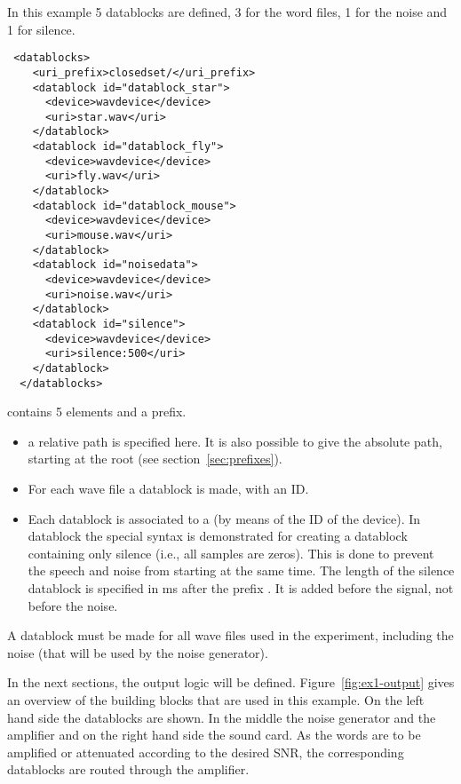 In this example 5 datablocks are defined, 3 for the word files, 1
for the noise and 1 for silence.

\begin{lstlisting}
 <datablocks>
    <uri_prefix>closedset/</uri_prefix>
    <datablock id="datablock_star">
      <device>wavdevice</device>
      <uri>star.wav</uri>
    </datablock>
    <datablock id="datablock_fly">
      <device>wavdevice</device>
      <uri>fly.wav</uri>
    </datablock>
    <datablock id="datablock_mouse">
      <device>wavdevice</device>
      <uri>mouse.wav</uri>
    </datablock>
    <datablock id="noisedata">
      <device>wavdevice</device>
      <uri>noise.wav</uri>
    </datablock>
    <datablock id="silence">
      <device>wavdevice</device>
      <uri>silence:500</uri>
    </datablock>
  </datablocks>
\end{lstlisting}

 contains 5  elements and a
prefix.
\begin{itemize}
\item {} a relative path is specified here. It
is also possible to give the absolute path, starting at the root
(see section~\ref{sec:prefixes}).

\item {} For each wave file a datablock is made,
with an ID.  \item Each datablock is associated to a
 (by means of the ID of the device). In datablock
 the special syntax is demonstrated for creating a
datablock containing only silence (i.e., all samples are zeros).
This is done to prevent the speech and noise from starting at the
same time. The length of the silence datablock is specified in ms
after the prefix . It is added before the signal, not
before the noise.

\end{itemize}
  
 

A datablock must be made for all wave files used in the
experiment, including the noise (that will be used by the noise
generator).



In the next sections, the output logic will be defined.
Figure~\ref{fig:ex1-output} gives an overview of the building
blocks that are used in this example. On the left hand side the
datablocks are shown. In the middle the noise generator and the
amplifier and on the right hand side the sound card. As the words
are to be amplified or attenuated according to the desired SNR,
the corresponding datablocks are routed through the amplifier.


